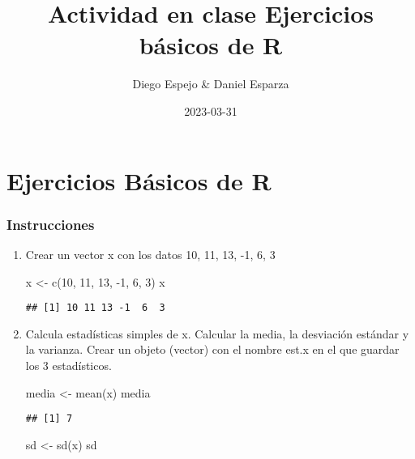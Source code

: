 \documentclass[
]{article}
\title{Actividad en clase \textbar{} Ejercicios básicos de R}
\author{Diego Espejo \& Daniel Esparza}
\date{2023-03-31}
\newenvironment{Shaded}{\begin{snugshade}}{\end{snugshade}}
\newcommand{\DecValTok}[1]{\textcolor[rgb]{0.00,0.00,0.81}{#1}}
\newcommand{\FunctionTok}[1]{\textcolor[rgb]{0.00,0.00,0.00}{#1}}
\newcommand{\NormalTok}[1]{#1}
\newcommand{\OtherTok}[1]{\textcolor[rgb]{0.56,0.35,0.01}{#1}}
\newcommand{\SpecialCharTok}[1]{\textcolor[rgb]{0.00,0.00,0.00}{#1}}
\begin{document}
\maketitle

\hypertarget{ejercicios-buxe1sicos-de-r}{%
\section{Ejercicios Básicos de R}\label{ejercicios-buxe1sicos-de-r}}

\hypertarget{instrucciones}{%
\subsubsection{Instrucciones}\label{instrucciones}}

\begin{enumerate}
\def\labelenumi{\arabic{enumi}.}
\item
  Crear un vector x con los datos 10, 11, 13, -1, 6, 3

\begin{Shaded}
\begin{Highlighting}[]
\NormalTok{x }\OtherTok{\textless{}{-}} \FunctionTok{c}\NormalTok{(}\DecValTok{10}\NormalTok{, }\DecValTok{11}\NormalTok{, }\DecValTok{13}\NormalTok{, }\SpecialCharTok{{-}}\DecValTok{1}\NormalTok{, }\DecValTok{6}\NormalTok{, }\DecValTok{3}\NormalTok{)}
\NormalTok{x}
\end{Highlighting}
\end{Shaded}

\begin{verbatim}
## [1] 10 11 13 -1  6  3
\end{verbatim}
\item
  Calcula estadísticas simples de x. Calcular la media, la desviación
  estándar y la varianza. Crear un objeto (vector) con el nombre est.x
  en el que guardar los 3 estadísticos.

\begin{Shaded}
\begin{Highlighting}[]
\NormalTok{media }\OtherTok{\textless{}{-}} \FunctionTok{mean}\NormalTok{(x)}
\NormalTok{media}
\end{Highlighting}
\end{Shaded}

\begin{verbatim}
## [1] 7
\end{verbatim}

\begin{Shaded}
\begin{Highlighting}[]
\NormalTok{sd }\OtherTok{\textless{}{-}} \FunctionTok{sd}\NormalTok{(x)}
\NormalTok{sd}
\end{Highlighting}
\end{Shaded}


\end{enumerate}
\end{document}
